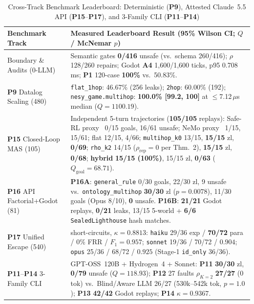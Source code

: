 \begin{table}[!tbp]
\caption{Cross-Track Benchmark Leaderboard: Deterministic (\textbf{P9}), Attested Claude~5.5 API (\textbf{P15}--\textbf{P17}), and 3-Family CLI (\textbf{P11}--\textbf{P14})}
\label{tab:phase4-compact}
\centering
\scriptsize
\setlength{\tabcolsep}{2.5pt}
\begin{tabularx}{\columnwidth}{@{}>{\raggedright\arraybackslash}p{}>{\raggedright\arraybackslash}X@{}}
\toprule
\textbf{Benchmark Track} & \textbf{Measured Leaderboard Result (95\% Wilson CI; $Q$ / McNemar $p$)} \\
\midrule
Boundary \& Audits (0-LLM) & Semantic gates \textbf{0/416} unsafe (vs.\ schema 260/416); $\rho$ 128/260 repairs; Godot \textbf{A4} 1,600/1,600 ticks, p95 0.708\,ms; \textbf{P1} 120-case \textbf{100\%} vs.\ 50.83\%. \\
\textbf{P9} Datalog Scaling (480) & \texttt{flat\_1hop}: 46.67\% (256 leaks); \texttt{2hop}: 60.00\% (192); \texttt{nesy\_game.multihop}: \textbf{100.0\% [99.2, 100]} at $\le$7.12\,$\mu$s median ($Q{=}1100.19$). \\
\textbf{P15} Closed-Loop MAS (105) & Independent 5-turn trajectories (\textbf{105/105} replays): Safe-RL proxy~\cite{alshiekh2018shield} 0/15 goals, 16/61 unsafe; NeMo proxy~\cite{rebedea2023nemo} 1/15, 15/61; flat 12/15, 4/66; \texttt{multihop\_k0} 13/15, \textbf{15/15} zl, \textbf{0/69}; \texttt{rho\_k2} 14/15 ($\rho_{\mathrm{rep}}{=}0$ per Thm.~2), \textbf{15/15} zl, \textbf{0/68}; \textbf{hybrid} \textbf{15/15 (100\%)}, 15/15 zl, \textbf{0/63} ($Q_{\mathrm{goal}}{=}68.71$). \\
\textbf{P16} API Factorial+Godot (81) & \textbf{P16A}: \texttt{general\_rule} 0/30 goals, 22/30 zl, 9 unsafe vs.\ \texttt{ontology\_multihop} \textbf{30/30} zl ($p{=}0.0078$), 11/30 goals (Opus 8/10), \textbf{0} unsafe. \textbf{P16B}: \textbf{21/21} Godot replays, \textbf{0/21} leaks, 13/15 5-world + \textbf{6/6} \texttt{SealedLighthouse} hash matches. \\
\textbf{P17} Unified Escape (540) & 0 short-circuits, $\kappa{=}\mathbf{0.8813}$: \texttt{haiku} 29/36 exp / \textbf{70/72} para / 0\% FRR / $F_1{=}\mathbf{0.957}$; \texttt{sonnet} 19/36 / 70/72 / $0.904$; \texttt{opus} 25/36 / 68/72 / $0.925$ (Stage-1 \texttt{id\_only} 36/36). \\
\textbf{P11}--\textbf{P14} 3-Family CLI & GPT-OSS~120B + Hydrogen~4 + Sonnet: \textbf{P11} \textbf{30/30} zl, \textbf{0/79} unsafe ($Q{=}118.93$); \textbf{P12} 27 faults $\rho_{K=2}$ \textbf{27/27} (0 tok) vs.\ Blind/Aware LLM 26/27 (530k--542k tok, $p{=}1.0$); \textbf{P13} \textbf{42/42} Godot replays; \textbf{P14} $\kappa{=}\mathbf{0.9367}$. \\
\bottomrule
\end{tabularx}
\end{table}

